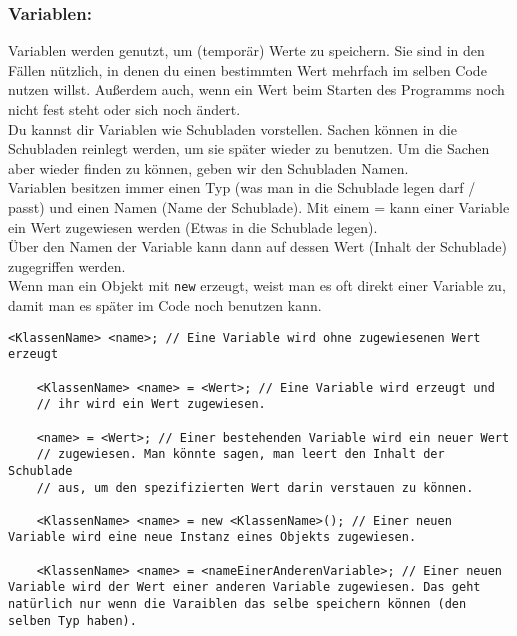 \begin{Infobox}
	\subsubsection*{Variablen:}
	Variablen werden genutzt, um (temporär) Werte zu speichern.
	Sie sind in den Fällen nützlich, in denen du einen bestimmten Wert mehrfach im selben Code nutzen willst.
	Außerdem auch, wenn ein Wert beim Starten des Programms noch nicht fest steht oder sich noch ändert.\\

	Du kannst dir Variablen wie Schubladen vorstellen. Sachen können in die Schubladen reinlegt werden, um sie später wieder zu benutzen. Um die Sachen aber wieder finden zu können, geben wir den Schubladen Namen.\\

	Variablen besitzen immer einen Typ (was man in die Schublade legen darf / passt) und einen Namen (Name der Schublade).
	Mit einem = kann einer Variable ein Wert zugewiesen werden (Etwas in die Schublade legen).\\
	Über den Namen der Variable kann dann auf dessen Wert (Inhalt der Schublade) zugegriffen werden.\\

	Wenn man ein Objekt mit \lstinline{new} erzeugt, weist man es oft direkt einer Variable zu, damit man es später im Code noch benutzen kann.
\end{Infobox}

\newpage

\begin{lstlisting}[title=\textbf{Variablen Syntax}]
	<KlassenName> <name>; // Eine Variable wird ohne zugewiesenen Wert erzeugt

	<KlassenName> <name> = <Wert>; // Eine Variable wird erzeugt und
	// ihr wird ein Wert zugewiesen.

	<name> = <Wert>; // Einer bestehenden Variable wird ein neuer Wert
	// zugewiesen. Man könnte sagen, man leert den Inhalt der Schublade
	// aus, um den spezifizierten Wert darin verstauen zu können.

	<KlassenName> <name> = new <KlassenName>(); // Einer neuen Variable wird eine neue Instanz eines Objekts zugewiesen.

	<KlassenName> <name> = <nameEinerAnderenVariable>; // Einer neuen Variable wird der Wert einer anderen Variable zugewiesen. Das geht natürlich nur wenn die Varaiblen das selbe speichern können (den selben Typ haben).
\end{lstlisting}

